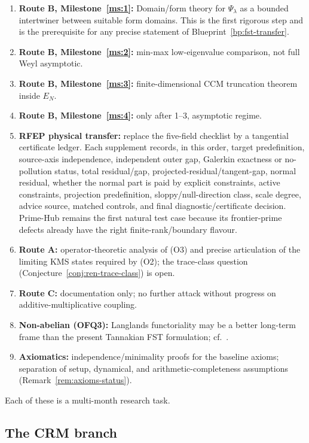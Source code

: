 \documentclass[11pt,a4paper]{article}
\theoremstyle{plain}
\theoremstyle{definition}
\begin{document}
\begin{enumerate}[leftmargin=*]
\item \textbf{Route B, Milestone~\ref{ms:1}:} Domain/form theory for
  $\Psi_\lambda$ as a bounded intertwiner between suitable form
  domains.  This is the first rigorous step and is the prerequisite
  for any precise statement of Blueprint~\ref{bp:fst-transfer}.
\item \textbf{Route B, Milestone~\ref{ms:2}:} min-max low-eigenvalue
  comparison, not full Weyl asymptotic.
\item \textbf{Route B, Milestone~\ref{ms:3}:} finite-dimensional CCM
  truncation theorem inside $E_N$.
\item \textbf{Route B, Milestone~\ref{ms:4}:} only after 1--3,
  asymptotic regime.
\item \textbf{RFEP physical transfer:} replace the five-field
  checklist by a tangential certificate ledger.  Each supplement
  records, in this order, target predefinition, source-axis
  independence, independent outer gap, Galerkin exactness or
  no-pollution status, total residual/gap,
  projected-residual/tangent-gap, normal residual, whether the normal
  part is paid by explicit constraints, active constraints,
  projection predefinition, sloppy/null-direction class, scale degree,
  advice source, matched controls, and final diagnostic/certificate
  decision.
  Prime-Hub remains the first natural test case because its
  frontier-prime defects already have the right finite-rank/boundary
  flavour.
\item \textbf{Route A:} operator-theoretic analysis of (O3) and
  precise articulation of the limiting KMS states required by (O2);
  the trace-class question
  (Conjecture~\ref{conj:ren-trace-class}) is open.
\item \textbf{Route C:} documentation only; no further attack
  without progress on additive-multiplicative coupling.
\item \textbf{Non-abelian (OFQ3):}  Langlands functoriality may be a
  better long-term frame than the present Tannakian FST formulation;
  cf.~\cite{TannakianAxioms}.
\item \textbf{Axiomatics:} independence/minimality proofs for the
  baseline axioms; separation of setup, dynamical, and
  arithmetic-completeness assumptions
  (Remark~\ref{rem:axioms-status}).
\end{enumerate}

Each of these is a multi-month research task.

\subsection{The CRM branch}
\end{document}
